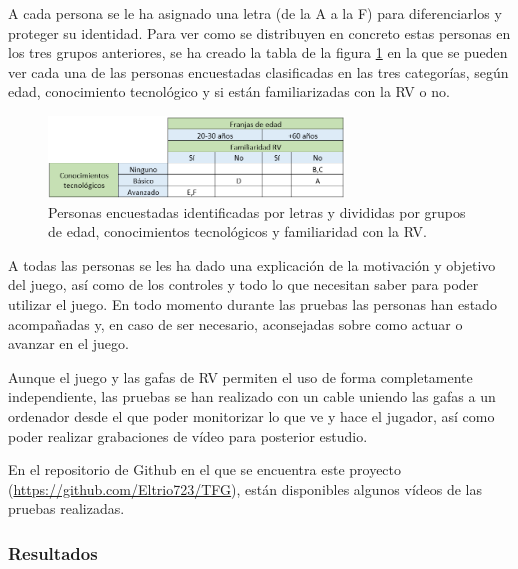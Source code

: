 A cada persona se le ha asignado una letra (de la A a la F) para diferenciarlos y proteger su identidad. Para ver como se distribuyen en concreto estas personas en los tres grupos anteriores, se ha creado la tabla de la figura \ref{fig:tablaPersonasLetras} en la que se pueden ver cada una de las personas encuestadas clasificadas en las tres categorías, según edad, conocimiento tecnológico y si están familiarizadas con la RV o no.




\begin{figure}
	\centering
	\includegraphics[width=0.7\textwidth]{04.Desarrollo/05.Entrega5/02.Iteracion5_2/00.Figuras/02.tabla_personas_letras.png}
	\caption{Personas encuestadas identificadas por letras y divididas por grupos de edad, conocimientos tecnológicos y familiaridad con la RV.}
	\label{fig:tablaPersonasLetras}
\end{figure}


A todas las personas se les ha dado una explicación de la motivación y objetivo del juego, así como de los controles y todo lo que necesitan saber para poder utilizar el juego. En todo momento durante las pruebas las personas han estado acompañadas y, en caso de ser necesario, aconsejadas sobre como actuar o avanzar en el juego.

Aunque el juego y las gafas de RV permiten el uso de forma completamente independiente, las pruebas se han realizado con un cable uniendo las gafas a un ordenador desde el que poder monitorizar lo que ve y hace el jugador, así como poder realizar grabaciones de vídeo para posterior estudio.


En el repositorio de Github en el que se encuentra este proyecto (\url{https://github.com/Eltrio723/TFG}), están disponibles algunos vídeos de las pruebas realizadas.


\subsubsection{Resultados}
\label{sec:e5i2:res}


